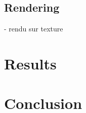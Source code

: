 \documentclass{article}
\begin{document}
\subsection*{Rendering}

- rendu sur texture \\

\section*{Results}

\section*{Conclusion}

\nocite{*}



\appendix

%
\end{document}
